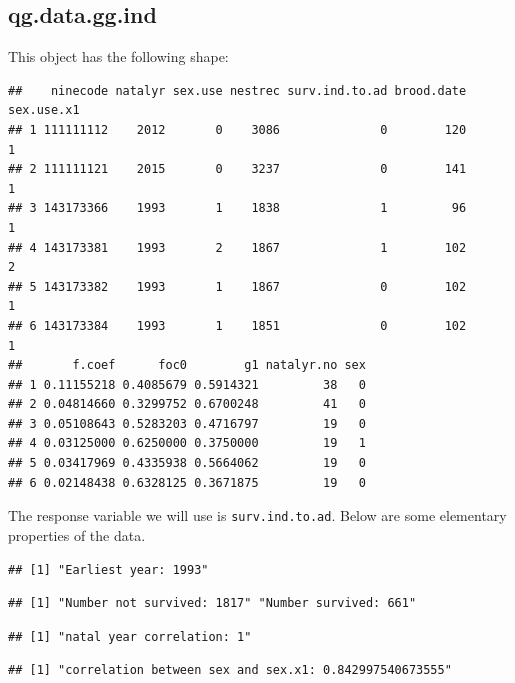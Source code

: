 \hypertarget{qg.data.gg.ind}{%
\subsection*{qg.data.gg.ind}\label{qg.data.gg.ind}}

This object has the following shape:

\begin{Shaded}
\begin{Highlighting}[]
\end{Highlighting}
\end{Shaded}

\begin{verbatim}
##    ninecode natalyr sex.use nestrec surv.ind.to.ad brood.date sex.use.x1
## 1 111111112    2012       0    3086              0        120          1
## 2 111111121    2015       0    3237              0        141          1
## 3 143173366    1993       1    1838              1         96          1
## 4 143173381    1993       2    1867              1        102          2
## 5 143173382    1993       1    1867              0        102          1
## 6 143173384    1993       1    1851              0        102          1
##       f.coef      foc0        g1 natalyr.no sex
## 1 0.11155218 0.4085679 0.5914321         38   0
## 2 0.04814660 0.3299752 0.6700248         41   0
## 3 0.05108643 0.5283203 0.4716797         19   0
## 4 0.03125000 0.6250000 0.3750000         19   1
## 5 0.03417969 0.4335938 0.5664062         19   0
## 6 0.02148438 0.6328125 0.3671875         19   0
\end{verbatim}

The response variable we will use is \texttt{surv.ind.to.ad}. Below are
some elementary properties of the data.

\begin{verbatim}
## [1] "Earliest year: 1993"
\end{verbatim}

\begin{verbatim}
## [1] "Number not survived: 1817" "Number survived: 661"
\end{verbatim}

\begin{verbatim}
## [1] "natal year correlation: 1"
\end{verbatim}

\begin{verbatim}
## [1] "correlation between sex and sex.x1: 0.842997540673555"
\end{verbatim}

